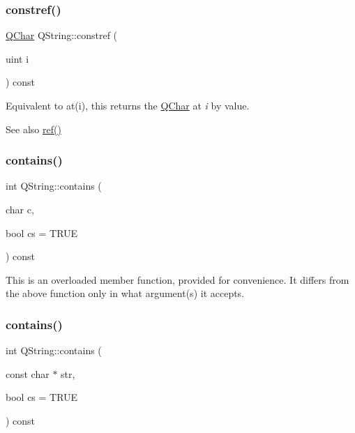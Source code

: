 \subsubsection{\texorpdfstring{constref()}{constref()}}
{\footnotesize\ttfamily \mbox{\hyperlink{class_q_char}{Q\+Char}} Q\+String\+::constref (\begin{DoxyParamCaption}\item[{uint}]{i }\end{DoxyParamCaption}) const\hspace{0.3cm}{\ttfamily [inline]}}

Equivalent to at(i), this returns the \mbox{\hyperlink{class_q_char}{Q\+Char}} at {\itshape i} by value.

\begin{DoxySeeAlso}{See also}
\mbox{\hyperlink{class_q_string_aeed075cd66817a54e5a2d55ec0e68f4d}{ref()}} 
\end{DoxySeeAlso}
\mbox{\label{class_q_string_adf600f28026a425717c0b06b73eb6647}} 
\subsubsection{\texorpdfstring{contains()}{contains()}\hspace{0.1cm}{\footnotesize\ttfamily [1/5]}}
{\footnotesize\ttfamily int Q\+String\+::contains (\begin{DoxyParamCaption}\item[{char}]{c,  }\item[{bool}]{cs = {\ttfamily TRUE} }\end{DoxyParamCaption}) const\hspace{0.3cm}{\ttfamily [inline]}}

This is an overloaded member function, provided for convenience. It differs from the above function only in what argument(s) it accepts.\mbox{\label{class_q_string_aeee533389b8072c556a9d479fb27c01f}} 
\subsubsection{\texorpdfstring{contains()}{contains()}\hspace{0.1cm}{\footnotesize\ttfamily [2/5]}}
{\footnotesize\ttfamily int Q\+String\+::contains (\begin{DoxyParamCaption}\item[{const char $\ast$}]{str,  }\item[{bool}]{cs = {\ttfamily TRUE} }\end{DoxyParamCaption}) const}

